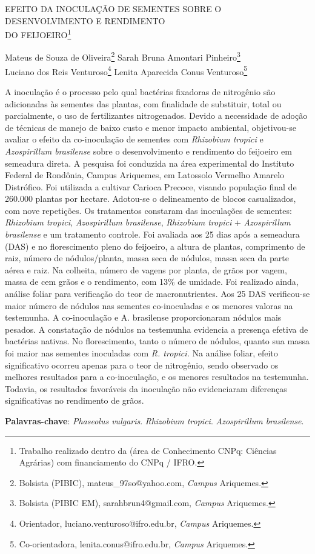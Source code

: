 \documentclass[article,12pt,onesidea,4paper,english,brazil]{abntex2}
\begin{document}
	
	
	\frenchspacing 
	
	\begin{center}
		\LARGE EFEITO DA INOCULAÇÃO DE SEMENTES SOBRE O DESENVOLVIMENTO E
		RENDIMENTO\\DO FEIJOEIRO\footnote{Trabalho realizado dentro da (área de Conhecimento CNPq: Ciências Agrárias) com financiamento do CNPq / IFRO.}
		
		\normalsize
		Mateus de Souza de Oliveira\footnote{Bolsista (PIBIC), mateus\_97so@yahoo.com, \textit{Campus} Ariquemes.} 
		Sarah Bruna Amontari Pinheiro\footnote{Bolsista (PIBIC EM), sarahbrun4@gmail.com, \textit{Campus} Ariquemes.} \\
		Luciano dos Reis Venturoso\footnote{Orientador, luciano.venturoso@ifro.edu.br, \textit{Campus} Ariquemes.} 
		Lenita Aparecida Conus Venturoso\footnote{Co-orientadora, lenita.conus@ifro.edu.br, \textit{Campus} Ariquemes.} 
	\end{center}
	
	\noindent A inoculação é o processo pelo qual bactérias fixadoras de nitrogênio são
	adicionadas às sementes das plantas, com finalidade de substituir, total ou
	parcialmente, o uso de fertilizantes nitrogenados. Devido a necessidade de adoção
	de técnicas de manejo de baixo custo e menor impacto ambiental, objetivou-se
	avaliar o efeito da co-inoculação de sementes com \textit{Rhizobium tropici} e \textit{Azospirillum brasilense} sobre o desenvolvimento e rendimento do feijoeiro em semeadura direta.
	A pesquisa foi conduzida na área experimental do Instituto Federal de Rondônia,
	Campus Ariquemes, em Latossolo Vermelho Amarelo Distrófico. Foi utilizada a
	cultivar Carioca Precoce, visando população final de 260.000 plantas por hectare.
	Adotou-se o delineamento de blocos casualizados, com nove repetições. Os
	tratamentos constaram das inoculações de sementes: \textit{Rhizobium tropici},
	\textit{Azospirillum brasilense}, \textit{Rhizobium tropici} + \textit{Azospirillum brasilense} e um tratamento controle. Foi avaliada aos 25 dias após a semeadura (DAS) e no florescimento pleno do feijoeiro, a altura de plantas, comprimento de raiz, número de nódulos/planta, massa seca de nódulos, massa seca da parte aérea e raiz. Na colheita, número de vagens por planta, de grãos por vagem, massa de cem grãos e o rendimento, com
	13\% de umidade. Foi realizado ainda, análise foliar para verificação do teor de
	macronutrientes. Aos 25 DAS verificou-se maior número de nódulos nas sementes
	co-inoculadas e os menores valoras na testemunha. A co-inoculação e A. brasilense
	proporcionaram nódulos mais pesados. A constatação de nódulos na testemunha
	evidencia a presença efetiva de bactérias nativas. No florescimento, tanto o número
	de nódulos, quanto sua massa foi maior nas sementes inoculadas com \textit{R. tropici.} Na
	análise foliar, efeito significativo ocorreu apenas para o teor de nitrogênio, sendo
	observado os melhores resultados para a co-inoculação, e os menores resultados na
	testemunha. Todavia, os resultados favoráveis da inoculação não evidenciaram
	diferenças significativas no rendimento de grãos.
	
	\vspace{\onelineskip}
	
	\noindent
	\textbf{Palavras-chave}: \textit{Phaseolus vulgaris}. \textit{Rhizobium tropici}. \textit{Azospirillum brasilense}.
	
\end{document}
